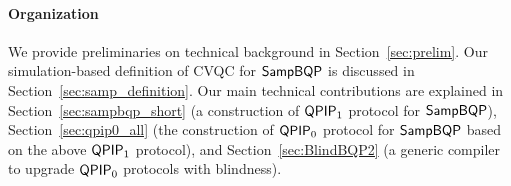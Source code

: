 \paragraph{Organization}
We provide preliminaries on technical background in Section~\ref{sec:prelim}. 
Our simulation-based definition of CVQC for $\operatorname{\mathsf{SampBQP}}$ is discussed in Section~\ref{sec:samp_definition}. 
Our main technical contributions are explained in Section~\ref{sec:sampbqp_short} (a construction of $\operatorname{\mathsf{QPIP}}_1$ protocol for $\operatorname{\mathsf{SampBQP}}$), 
Section~\ref{sec:qpip0_all} (the construction of $\operatorname{\mathsf{QPIP}}_0$ protocol for $\operatorname{\mathsf{SampBQP}}$ based on the above $\operatorname{\mathsf{QPIP}}_1$ protocol), 
and Section~\ref{sec:BlindBQP2} (a generic compiler to upgrade $\operatorname{\mathsf{QPIP}}_0$ protocols with blindness). 